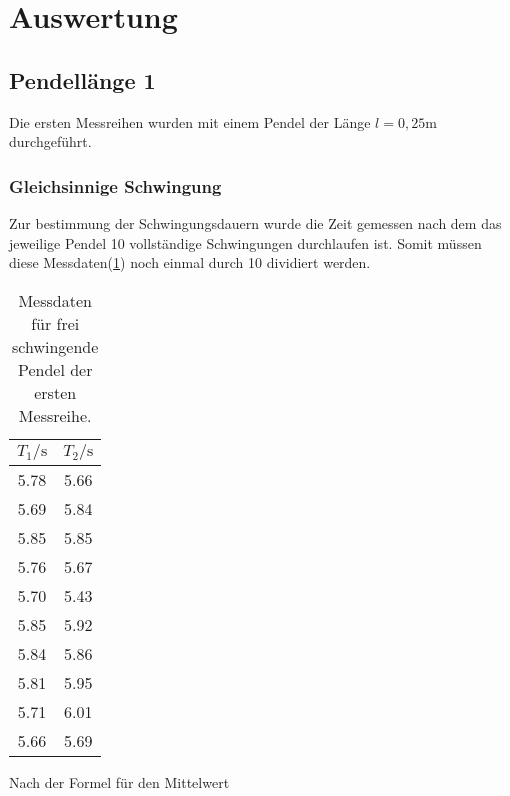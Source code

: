 \section{Auswertung}

    \subsection{Pendellänge 1}

        \noindent Die ersten Messreihen wurden mit einem Pendel der Länge $l = 0,25 \si{\m}$ durchgeführt.

        \subsubsection{Gleichsinnige Schwingung}

            \noindent Zur bestimmung der Schwingungsdauern wurde die Zeit gemessen nach dem das jeweilige Pendel 10 vollständige Schwingungen 
            durchlaufen ist. Somit müssen diese Messdaten(\ref{tab:frei1}) noch einmal durch 10 dividiert werden.

            \begin{table}[ht]
                \centering
                \caption{Messdaten für frei schwingende Pendel der ersten Messreihe.}
                \label{tab:frei1}
                \begin{tabular}{c c}
                 \toprule
                 $T_1 / \si{\s}$ & $T_2 / \si{\s}$\\
                 \midrule
                 5.78  &  5.66 \\
                 5.69  &  5.84 \\
                 5.85  &  5.85 \\
                 5.76  &  5.67 \\
                 5.70  &  5.43 \\
                 5.85  &  5.92 \\
                 5.84  &  5.86 \\
                 5.81  &  5.95 \\
                 5.71  &  6.01 \\
                 5.66  &  5.69 \\
                 \bottomrule
                \end{tabular}
            \end{table}

            \noindent Nach der Formel für den Mittelwert 

